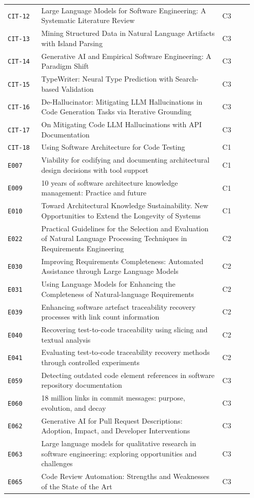 \documentclass{article}
\begin{document}
\begin{longtable}{p{0.13\linewidth}p{0.70\linewidth}p{0.12\linewidth}}
\texttt{CIT-12} & Large Language Models for Software Engineering: A Systematic Literature Review & C3 \\
\texttt{CIT-13} & Mining Structured Data in Natural Language Artifacts with Island Parsing & C3 \\
\texttt{CIT-14} & Generative AI and Empirical Software Engineering: A Paradigm Shift & C3 \\
\texttt{CIT-15} & TypeWriter: Neural Type Prediction with Search-based Validation & C3 \\
\texttt{CIT-16} & De-Hallucinator: Mitigating LLM Hallucinations in Code Generation Tasks via Iterative Grounding & C3 \\
\texttt{CIT-17} & On Mitigating Code LLM Hallucinations with API Documentation & C3 \\
\texttt{CIT-18} & Using Software Architecture for Code Testing & C1 \\
\texttt{E007} & Viability for codifying and documenting architectural design decisions with tool support & C1 \\
\texttt{E009} & 10 years of software architecture knowledge management: Practice and future & C1 \\
\texttt{E010} & Toward Architectural Knowledge Sustainability. New Opportunities to Extend the Longevity of Systems & C1 \\
\texttt{E022} & Practical Guidelines for the Selection and Evaluation of Natural Language Processing Techniques in Requirements Engineering & C2 \\
\texttt{E030} & Improving Requirements Completeness: Automated Assistance through Large Language Models & C2 \\
\texttt{E031} & Using Language Models for Enhancing the Completeness of Natural-language Requirements & C2 \\
\texttt{E039} & Enhancing software artefact traceability recovery processes with link count information & C2 \\
\texttt{E040} & Recovering test-to-code traceability using slicing and textual analysis & C2 \\
\texttt{E041} & Evaluating test‐to‐code traceability recovery methods through controlled experiments & C2 \\
\texttt{E059} & Detecting outdated code element references in software repository documentation & C3 \\
\texttt{E060} & 18 million links in commit messages: purpose, evolution, and decay & C3 \\
\texttt{E062} & Generative AI for Pull Request Descriptions: Adoption, Impact, and Developer Interventions & C3 \\
\texttt{E063} & Large language models for qualitative research in software engineering: exploring opportunities and challenges & C3 \\
\texttt{E065} & Code Review Automation: Strengths and Weaknesses of the State of the Art & C3 \\
\bottomrule
\end{longtable}
\end{document}
